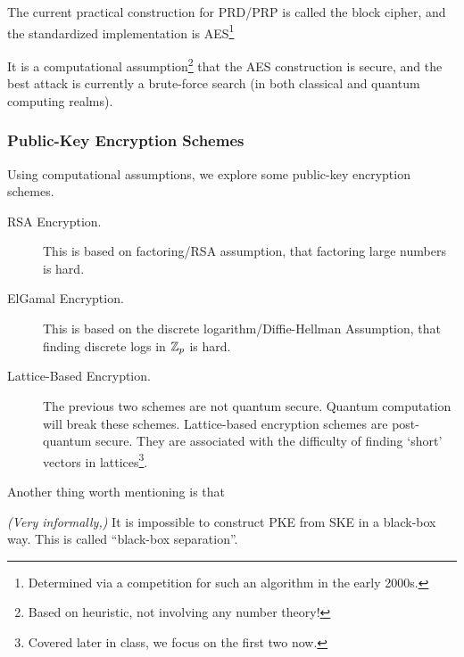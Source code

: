 The current practical construction for PRD/PRP is called the block cipher, and the standardized implementation is AES\footnote{Determined via a competition for such an algorithm in the early 2000s. }

It is a computational assumption\footnote{Based on heuristic, not involving any number theory!} that the AES construction is secure, and the best attack is currently a brute-force search (in both classical and quantum computing realms).

\subsubsection{Public-Key Encryption Schemes}
Using computational assumptions, we explore some public-key encryption schemes.

\begin{description}
    \item[RSA Encryption.] This is based on factoring/RSA assumption, that factoring large numbers is hard.
    \item[ElGamal Encryption.] This is based on the discrete logarithm/Diffie-Hellman Assumption, that finding discrete logs in $\mathbb Z_p$ is hard.
    \item[Lattice-Based Encryption.] The previous two schemes are not quantum secure. Quantum computation will break these schemes. Lattice-based encryption schemes are post-quantum secure. They are associated with the difficulty of finding `short' vectors in lattices\footnote{Covered later in class, we focus on the first two now.}.
\end{description}

Another thing worth mentioning is that
\begin{theorem}
    \emph{(Very informally,)} It is impossible to construct PKE from SKE in a black-box way. This is called ``black-box separation''.
\end{theorem}

